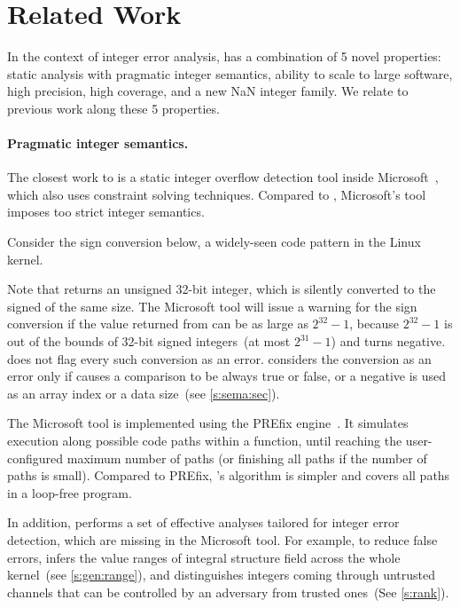 \section{Related Work}
\label{s:relwk}

In the context of integer error analysis, \sys has a combination of 5 novel
properties: static analysis with pragmatic integer semantics, ability to scale
to large software, high precision, high coverage, and a new NaN integer family.
We relate \sys to previous work along these 5 properties.

\paragraph{Pragmatic integer semantics.} The closest work to \sys is a static integer overflow detection
tool inside Microsoft~\cite{moy:z3prefix}, which also uses constraint solving
techniques.  Compared to \sys, Microsoft's tool imposes too strict integer
semantics.

Consider the sign conversion below, a widely-seen code pattern in
the Linux kernel.

Note that  returns an unsigned 32-bit integer, which
is silently converted to the signed  of the same size.
The Microsoft tool will issue a warning for the sign conversion if
the value returned from  can be as large as $2^{32}
- 1$, because $2^{32} - 1$ is out of the bounds of 32-bit signed
integers~(at most $2^{31} - 1$) and turns  negative.
%
\sys does not flag every such conversion as an error.  \sys considers
the conversion as an error only if  causes a comparison
to be always true or false, or a negative  is used as
an array index or a data size~(see \autoref{s:sema:sec}).

The Microsoft tool is implemented using the PREfix
engine~\cite{bush:prefix}.  It simulates execution along possible
code paths within a function, until reaching
the user-configured maximum number of paths (or finishing all paths
if the number of paths is small).
%
Compared to PREfix, \sys's algorithm is simpler
and covers all paths in a loop-free program.
\fi

In addition, \sys performs a set of effective analyses
tailored for integer error detection, which are missing in the
Microsoft tool.  For example, to reduce false errors, \sys infers
the value ranges of integral structure field across the whole
kernel~(see \autoref{s:gen:range}), and distinguishes integers coming
through untrusted channels that can be controlled by an adversary
from trusted ones~(See \autoref{s:rank}).

